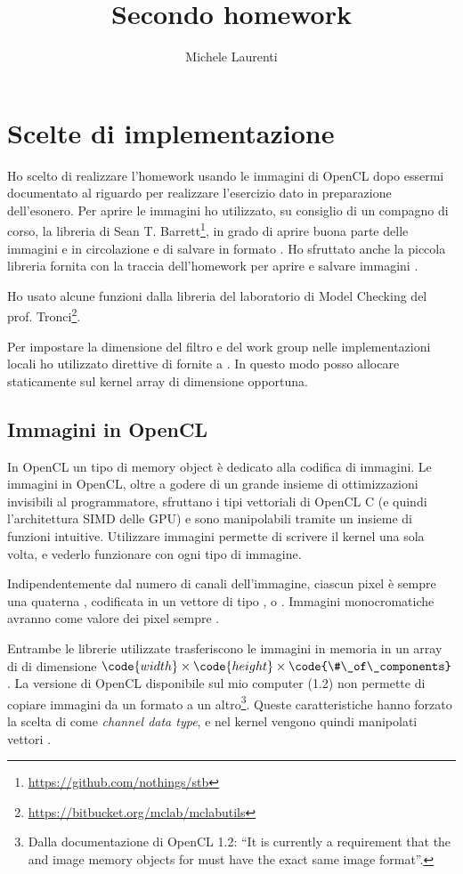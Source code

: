 \documentclass[10pt]{myarticle}
\author{Michele Laurenti}
\begin{document}
\title{Secondo homework}
\maketitle

\section{Scelte di implementazione}

Ho scelto di realizzare l'homework usando le immagini di OpenCL dopo essermi documentato al riguardo per realizzare l'esercizio dato in preparazione dell'esonero.
Per aprire le immagini ho utilizzato, su consiglio di un compagno di corso, la libreria di Sean T. Barrett\footnote{\url{https://github.com/nothings/stb}}, in grado di aprire buona parte delle immagini  e  in circolazione e di salvare in formato .
Ho sfruttato anche la piccola libreria fornita con la traccia dell'homework per aprire e salvare immagini .

Ho usato alcune funzioni dalla libreria del laboratorio di Model Checking del prof. Tronci\footnote{\url{https://bitbucket.org/mclab/mclabutils}}.

Per impostare la dimensione del filtro e del work group nelle implementazioni locali ho utilizzato direttive di  fornite a .
In questo modo posso allocare staticamente sul kernel array di dimensione opportuna. 

\subsection{Immagini in OpenCL}

In OpenCL un tipo di memory object \`e dedicato alla codifica di immagini.
Le immagini in OpenCL, oltre a godere di un grande insieme di ottimizzazioni invisibili al programmatore, sfruttano i tipi vettoriali di OpenCL C (e quindi l'architettura SIMD delle GPU) e sono manipolabili tramite un insieme di funzioni intuitive.
Utilizzare immagini permette di scrivere il kernel una sola volta, e vederlo funzionare con ogni tipo di immagine.

Indipendentemente dal numero di canali dell'immagine, ciascun pixel \`e sempre una quaterna , codificata in un vettore di tipo ,  o .
Immagini monocromatiche avranno come valore dei pixel sempre .

Entrambe le librerie utilizzate trasferiscono le immagini in memoria in un array di  di dimensione $\code{width} \times \code{height} \times \code{\#\_of\_components}$.
La versione di OpenCL disponibile sul mio computer (1.2) non permette di copiare immagini da un formato a un altro\footnote{Dalla documentazione di OpenCL 1.2: ``It is currently a requirement that the  and  image memory objects for  must have the exact same image format''.}.
Queste caratteristiche hanno forzato la scelta di  come \emph{channel data type}, e nel kernel vengono quindi manipolati vettori .
\end{document}
